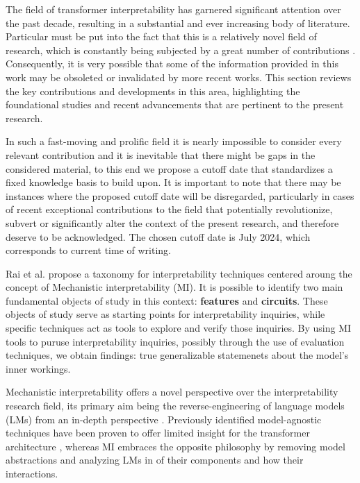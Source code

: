 The field of transformer interpretability has garnered significant attention over the past decade, resulting in a substantial and ever increasing body of literature.
Particular  must be put into the fact that this is a relatively novel field of research, which is constantly being subjected by a great number of contributions .
Consequently, it is very possible that some of the information provided in this work may be obsoleted or invalidated by more recent works.
This section reviews the key contributions and developments in this area, highlighting the foundational studies and recent advancements that are pertinent to the present research.

In such a fast-moving and prolific field it is nearly impossible to consider every relevant contribution and it is inevitable that there might be gaps in the considered material, to this end we propose a cutoff date that standardizes a fixed knowledge basis to build upon.
It is important to note that there may be instances where the proposed cutoff date will be disregarded, particularly in cases of recent exceptional contributions to the field that potentially revolutionize, subvert or significantly alter the context of the present research, and therefore deserve to be acknowledged.
The chosen cutoff date is July 2024, which corresponds to current time of writing.

Rai et al.  propose a taxonomy for interpretability techniques centered aroung the concept of Mechanistic interpretability (MI).
It is possible to identify two main fundamental objects of study in this context: \textbf{features} and \textbf{circuits}.
These objects of study serve as starting points for interpretability inquiries, while specific techniques act as tools to explore and verify those inquiries.
By using MI tools to puruse interpretability inquiries, possibly through the use of evaluation techniques, we obtain findings: true generalizable statemenets about the model's inner workings.

Mechanistic interpretability offers a novel perspective over the interpretability research field, its primary aim being the reverse-engineering of language models (LMs) from an in-depth perspective .
Previously identified model-agnostic techniques have been proven to offer limited insight for the transformer architecture , whereas MI embraces the opposite philosophy by removing model abstractions and analyzing LMs in  of their components and how their interactions.

